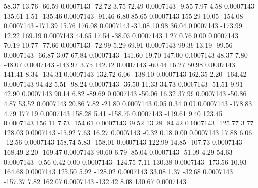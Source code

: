        58.37       13.76      -66.59     0.0007143
      -72.72        3.75       72.49     0.0007143
       -9.55        7.97        4.58     0.0007143
      135.61        1.51     -135.46     0.0007143
      -91.46        6.80       85.65     0.0007143
      155.29       10.05     -154.08     0.0007143
     -171.39       15.76      176.08     0.0007143
      -31.08       10.98       36.04     0.0007143
     -173.99       12.22      169.19     0.0007143
       44.65       17.54      -38.03     0.0007143
        1.27        0.76        0.00     0.0007143
       70.19       10.77      -77.66     0.0007143
      -72.99        5.29       69.91     0.0007143
       99.39       13.19      -99.56     0.0007143
      -66.87        3.07       67.84     0.0007143
     -141.60       19.70      147.00     0.0007143
       48.37        7.80      -48.07     0.0007143
     -143.97        3.75      142.12     0.0007143
      -60.44       16.27       50.98     0.0007143
      141.41        8.34     -134.31     0.0007143
      132.72        6.06     -138.10     0.0007143
      162.35        2.20     -164.42     0.0007143
       94.42        5.51      -98.24     0.0007143
      -36.50       11.33       34.73     0.0007143
      -51.51        9.91       42.90     0.0007143
       90.14        6.82      -89.69     0.0007143
      -50.06       16.32       37.99     0.0007143
      -50.86        4.87       53.52     0.0007143
       20.86        7.82      -21.80     0.0007143
        0.05        0.34        0.00     0.0007143
     -178.83        4.79      177.19     0.0007143
      158.28        5.41     -158.75     0.0007143
     -119.61        9.40      123.45     0.0007143
      156.11        7.73     -154.61     0.0007143
       69.52       13.28      -84.42     0.0007143
     -125.77        3.77      128.03     0.0007143
      -16.92        7.63       16.27     0.0007143
       -0.32        0.18        0.00     0.0007143
       17.88        6.06      -12.56     0.0007143
      158.74        5.83     -158.01     0.0007143
      122.99       14.85     -107.73     0.0007143
      168.49        2.20     -169.47     0.0007143
       90.60        6.79      -85.04     0.0007143
      -51.09        4.29       54.63     0.0007143
       -0.56        0.42        0.00     0.0007143
     -124.75        7.11      130.38     0.0007143
     -173.56       10.93      164.68     0.0007143
      125.50        5.92     -128.02     0.0007143
       33.08        1.37      -32.68     0.0007143
     -157.37        7.82      162.07     0.0007143
     -132.42        8.08      130.67     0.0007143

